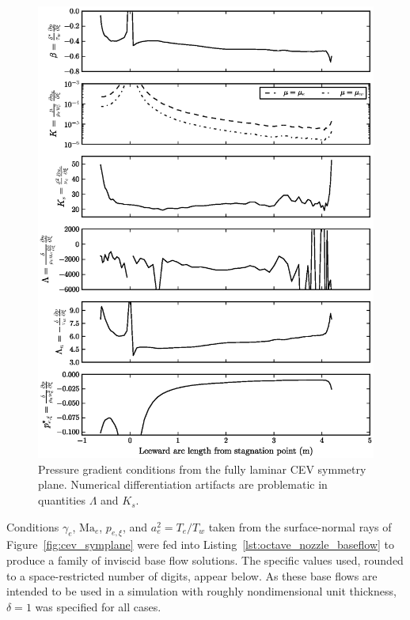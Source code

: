 \documentclass[letterpaper,11pt,nointlimits,reqno]{amsart}
\newcommand{\Mach}[1][]{\mbox{Ma}_{#1}}
\begin{document}
\begin{figure}[p]
  \centering
  \includegraphics[]{cev_summary_fpg}
  \caption{
    \label{fig:cev_summary_fpg}
    Pressure gradient conditions from the fully laminar CEV symmetry plane.
    Numerical differentiation artifacts are problematic in quantities $\Lambda$
    and $K_s$.
  }
\end{figure}

Conditions $\gamma_e$, $\Mach[e]{}$, $p_{e,\xi}$, and $a^2_e = T_e/T_w$ taken
from the surface-normal rays of Figure~\ref{fig:cev_symplane} were fed into
Listing~\ref{lst:octave_nozzle_baseflow} to produce a family of inviscid base
flow solutions.  The specific values used, rounded to a space-restricted number
of digits, appear below.  As these base flows are intended to be used in a
simulation with roughly nondimensional unit thickness, $\delta=1$ was specified
for all cases.
\end{document}
